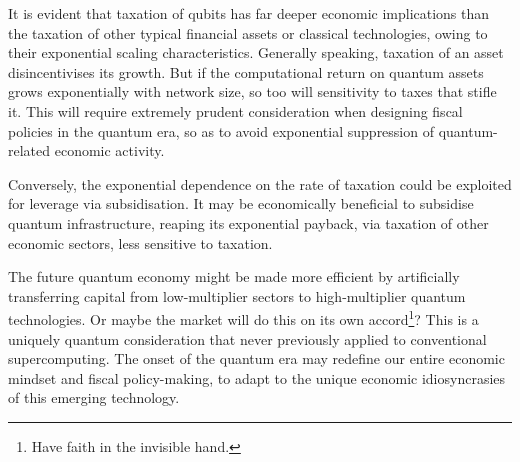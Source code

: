 It is evident that taxation of qubits has far deeper economic implications than the taxation of other typical financial assets or classical technologies, owing to their exponential scaling characteristics. Generally speaking, taxation of an asset disincentivises its growth. But if the computational return on quantum assets grows exponentially with network size, so too will sensitivity to taxes that stifle it. This will require extremely prudent consideration when designing fiscal policies in the quantum era, so as to avoid exponential suppression of quantum-related economic activity.

Conversely, the exponential dependence on the rate of taxation could be exploited for leverage via subsidisation. It may be economically beneficial to subsidise quantum infrastructure, reaping its exponential payback, via taxation of other economic sectors, less sensitive to taxation.

The future quantum economy might be made more efficient by artificially transferring capital from low-multiplier sectors to high-multiplier quantum technologies. Or maybe the market will do this on its own accord\footnote{Have faith in the invisible hand.}? This is a uniquely quantum consideration that never previously applied to conventional supercomputing. The onset of the quantum era may redefine our entire economic mindset and fiscal policy-making, to adapt to the unique economic idiosyncrasies of this emerging technology.
